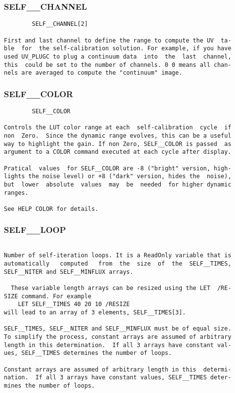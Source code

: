 \subsubsection{SELF\_\_CHANNEL}
\begin{verbatim}
        SELF__CHANNEL[2]

First and last channel to define the range to compute the UV  ta-
ble  for  the self-calibration solution. For example, if you have
used UV_PLUGC to plug a continuum data  into  the  last  channel,
this  could be set to the number of channels. 0 0 means all chan-
nels are averaged to compute the "continuum" image.

\end{verbatim}
\subsubsection{SELF\_\_COLOR}
\begin{verbatim}
        SELF__COLOR

Controls the LUT color range at each  self-calibration  cycle  if
non  Zero.  Since the dynamic range evolves, this can be a useful
way to highlight the gain. If non Zero, SELF__COLOR is passed  as
argument to a COLOR command executed at each cycle after display.

Pratical  values  for SELF__COLOR are -8 ("bright" version, high-
lights the noise level) or +8 ("dark" version, hides the  noise),
but  lower  absolute  values  may  be  needed  for higher dynamic
ranges.

See HELP COLOR for details.

\end{verbatim}
\subsubsection{SELF\_\_LOOP}
\begin{verbatim}

Number of self-iteration loops. It is a ReadOnly variable that is
automatically   computed   from  the  size  of  the  SELF__TIMES,
SELF__NITER and SELF__MINFLUX arrays.

  These variable length arrays can be resized using the LET  /RE-
SIZE command. For example
    LET SELF__TIMES 40 20 10 /RESIZE
will lead to an array of 3 elements, SELF__TIMES[3].

SELF__TIMES, SELF__NITER and SELF__MINFLUX must be of equal size.
To simplify the process, constant arrays are assumed of arbitrary
length in this determination.  If all 3 arrays have constant val-
ues, SELF__TIMES determines the number of loops.

Constant arrays are assumed of arbitrary length in this  determi-
nation.  If all 3 arrays have constant values, SELF__TIMES deter-
mines the number of loops.

\end{verbatim}
